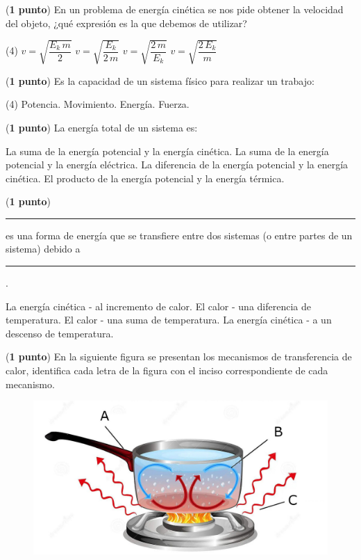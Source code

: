 \documentclass[12pt, letter]{exam}
\begin{document}
\begin{questions}
    \question (\textbf{1 punto}) En un problema de energía cinética se nos pide obtener la velocidad del objeto, ¿qué expresión es la que debemos de utilizar?
    \begin{tasks}(4)
        \task $v = \sqrt{\dfrac{E_{k} \, m}{2}}$
        \task $v = \sqrt{\dfrac{E_{k}}{2 \, m}}$
        \task $v = \sqrt{\dfrac{2 \, m}{E_{k}}}$
        \task $v = \sqrt{\dfrac{2 \, E_{k}}{m}}$
    \end{tasks}
    \question (\textbf{1 punto}) Es la capacidad de un sistema físico para realizar un trabajo:
    \begin{tasks}(4)
        \task Potencia.
        \task Movimiento.
        \task Energía.
        \task Fuerza.
    \end{tasks}
    \question (\textbf{1 punto}) La energía total de un sistema es:
    \begin{tasks}
        \task La suma de la energía potencial y la energía cinética.
        \task La suma de la energía potencial y la energía eléctrica.
        \task La diferencia de la energía potencial y la energía cinética.
        \task El producto de la energía potencial y la energía térmica.
    \end{tasks}
    \question (\textbf{1 punto}) \rule{2cm}{0.1mm} es una forma de energía que se transfiere entre dos sistemas (o entre partes de un sistema) debido a \rule{2cm}{0.1mm}.
    \begin{tasks}
        \task La energía cinética - al incremento de calor.
        \task El calor - una diferencia de temperatura.
        \task El calor - una suma de temperatura.
        \task La energía cinética - a un descenso de temperatura.
    \end{tasks}
    \question (\textbf{1 punto}) En la siguiente figura se presentan los mecanismos de transferencia de calor, identifica cada letra de la figura con el inciso correspondiente de cada mecanismo.
    \begin{figure}[H]
        \centering
        \includegraphics[scale=0.2]{Transferencia_Calor_01.jpg}

\end{figure}
\end{questions}
\end{document}

